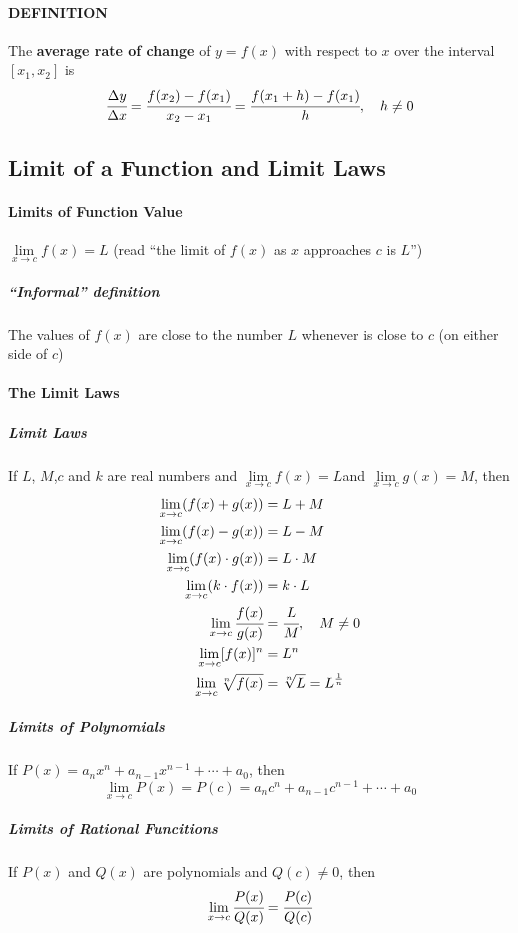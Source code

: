\documentclass{article}
\begin{document}
            \paragraph{DEFINITION} The \textbf{average rate of change} of $y=f(x)$ with respect to $x$ over the interval $[x_1,x_2]$ is
            \[\cfrac{\Delta y}{\Delta x}=\cfrac{f(x_2)-f(x_1)}{x_2-x_1}=\cfrac{f(x_1 +h)-f(x_1)}{h},\quad h\ne 0\]
            \subsection{Limit of a Function and Limit Laws}
                \paragraph{Limits of Function Value} $\lim\limits_{x\to c}f(x)=L$ (read ``the limit of $f(x)$ as $x$ approaches $c$ is $L$'')
                    \subparagraph{``Informal'' definition} The values of $f(x)$ are close to the number $L$ whenever is close to $c$ (on either side of $c$)
                \paragraph{The Limit Laws}
                    \subparagraph{Limit Laws} If $L$, $M$,$c$ and $k$ are real numbers and $\lim\limits_{x\to c}f(x)=L$\quad and \quad $\lim\limits_{x\to c} g(x)=M$, then
                    \begin{equation}
                        \begin{aligned}
                            \lim\limits_{x\to c} (f(x)+g(x))&=L+M\\
                            \lim\limits_{x\to c} (f(x)-g(x))&=L-M\\
                            \lim\limits_{x\to c} (f(x)\cdot g(x))&=L\cdot M\\
                            \lim\limits_{x\to c} (k\cdot f(x))&=k\cdot L\\
                            \lim\limits_{x\to c} \cfrac{f(x)}{g(x)}&= \cfrac{L}{M},\quad M\ne 0\\
                            \lim\limits_{x\to c}[f(x)]^n &=L^n\\
                            \lim\limits_{x\to c}\sqrt[n]{f(x)}&=\sqrt[n]{L}=L^{\frac{1}{n}}
                        \end{aligned}
                    \end{equation}
                    \subparagraph{Limits of Polynomials} If $P(x)=a_n x^n+a_{n-1}x^{n-1}+\cdots +a_0$, then 
                    \[\lim\limits_{x\to c}P(x)=P(c)=a_nc^n+a_{n-1}c^{n-1}+\cdots +a_0\]
                    \subparagraph{Limits of Rational Funcitions} If $P(x)$ and $Q(x)$ are polynomials and $Q(c)\ne 0$, then
                    \[\lim\limits_{x\to c} \cfrac{P(x)}{Q(x)}=\cfrac{P(c)}{Q(c)}\]
\end{document}
